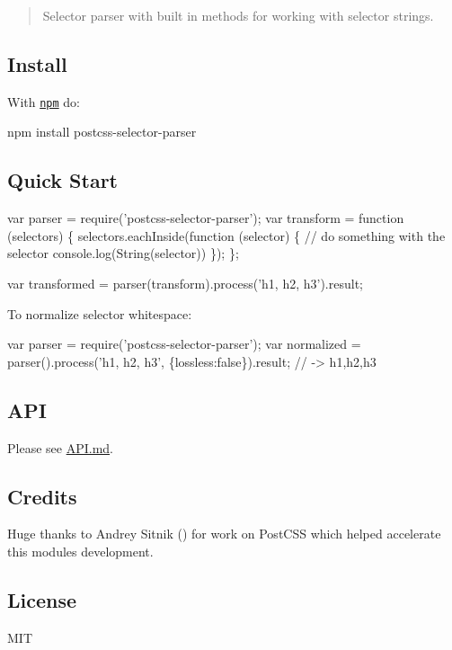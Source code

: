\begin{quote}
Selector parser with built in methods for working with selector strings. \end{quote}


\subsection*{Install}

With \href{https://npmjs.com/package/postcss-selector-parser}{\tt npm} do\+:


\begin{DoxyCode}
npm install postcss-selector-parser
\end{DoxyCode}


\subsection*{Quick Start}


\begin{DoxyCode}
var parser = require('postcss-selector-parser');
var transform = function (selectors) \{
    selectors.eachInside(function (selector) \{
        // do something with the selector
        console.log(String(selector))
    \});
\};

var transformed = parser(transform).process('h1, h2, h3').result;
\end{DoxyCode}


To normalize selector whitespace\+:


\begin{DoxyCode}
var parser = require('postcss-selector-parser');
var normalized = parser().process('h1, h2, h3', \{lossless:false\}).result;
// -> h1,h2,h3
\end{DoxyCode}


\subsection*{A\+PI}

Please see \mbox{\hyperlink{_a_p_i_8md}{A\+PI.md}}.

\subsection*{Credits}


\begin{DoxyItemize}
\item Huge thanks to Andrey Sitnik () for work on Post\+C\+SS which helped accelerate this module\textquotesingle{}s development.
\end{DoxyItemize}

\subsection*{License}

M\+IT 